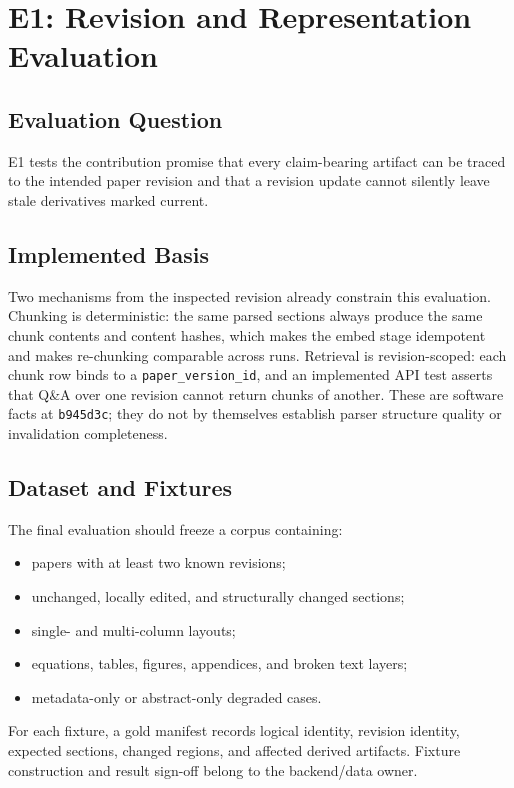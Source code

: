 \section{E1: Revision and Representation Evaluation}

\subsection{Evaluation Question}

E1 tests the contribution promise that every claim-bearing artifact can be traced to the intended paper revision and that a revision update cannot silently leave stale derivatives marked current.

\subsection{Implemented Basis}

Two mechanisms from the inspected revision already constrain this evaluation.
Chunking is deterministic: the same parsed sections always produce the same chunk contents and content hashes, which makes the embed stage idempotent and makes re-chunking comparable across runs.
Retrieval is revision-scoped: each chunk row binds to a \texttt{paper\_version\_id}, and an implemented API test asserts that Q\&A over one revision cannot return chunks of another.
These are software facts at \texttt{b945d3c}; they do not by themselves establish parser structure quality or invalidation completeness.

\subsection{Dataset and Fixtures}

The final evaluation should freeze a corpus containing:
\begin{itemize}
  \item papers with at least two known revisions;
  \item unchanged, locally edited, and structurally changed sections;
  \item single- and multi-column layouts;
  \item equations, tables, figures, appendices, and broken text layers;
  \item metadata-only or abstract-only degraded cases.
\end{itemize}
For each fixture, a gold manifest records logical identity, revision identity, expected sections, changed regions, and affected derived artifacts.
Fixture construction and result sign-off belong to the backend/data owner.

